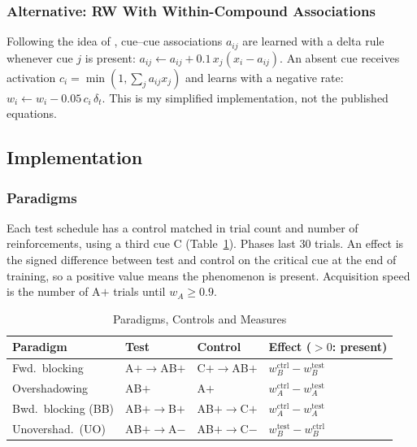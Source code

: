 \documentclass[conference,a4paper]{IEEEtran}
\begin{document}
\subsubsection{Alternative: RW With Within-Compound Associations}
Following the idea of \cite{vanhamme1994}, cue--cue associations $a_{ij}$ are
learned with a delta rule whenever cue $j$ is present:
$a_{ij}\leftarrow a_{ij} + 0.1\,x_j(x_i - a_{ij})$. An absent cue receives
activation $c_i = \min(1,\sum_j a_{ij}x_j)$ and learns with a negative rate:
$w_i \leftarrow w_i - 0.05\,c_i\,\delta_t$. This is my simplified implementation,
not the published equations.

\subsection{Implementation}
\subsubsection{Paradigms}
Each test schedule has a control matched in trial count and number of
reinforcements, using a third cue C (Table~\ref{tab:design}). Phases last 30
trials. An effect is the signed difference between test and control on the
critical cue at the end of training, so a positive value means the phenomenon is
present. Acquisition speed is the number of A$+$ trials until $w_A\geq0.9$.

\begin{table}[!t]
\centering\footnotesize
\setlength{\tabcolsep}{3pt}
\renewcommand{\arraystretch}{1.3}
\caption{Paradigms, Controls and Measures}
\label{tab:design}
\begin{tabular}{llll}
\toprule
Paradigm & Test & Control & Effect ($>0$: present)\\
\midrule
Fwd.\ blocking & A$+\to$AB$+$ & C$+\to$AB$+$ & $w_B^{\text{ctrl}} - w_B^{\text{test}}$\\
Overshadowing & AB$+$ & A$+$ & $w_A^{\text{ctrl}} - w_A^{\text{test}}$\\
Bwd.\ blocking (BB) & AB$+\to$B$+$ & AB$+\to$C$+$ & $w_A^{\text{ctrl}} - w_A^{\text{test}}$\\
Unovershad.\ (UO) & AB$+\to$A$-$ & AB$+\to$C$-$ & $w_B^{\text{test}} - w_B^{\text{ctrl}}$\\
\bottomrule
\end{tabular}
\end{table}
\end{document}
